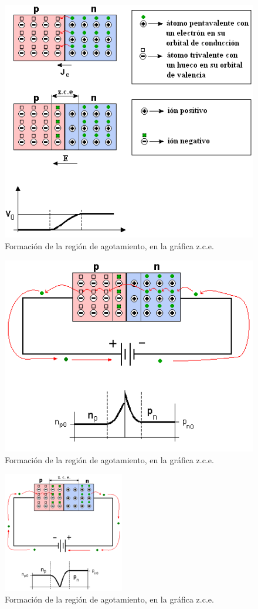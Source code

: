 \documentclass{article}
\author{Pablo Vivar Colina}
\begin{document}
\maketitle

\begin{figure}[h!]
\centering
\includegraphics[scale=0.5]{DiodoSem.png}
\caption{Formación de la región de agotamiento, en la gráfica z.c.e.}
\label{fig:diodoSem}
\end{figure}

\begin{figure}[h!]
\centering
\includegraphics[scale=0.4]{PolDir.png}
\caption{Formación de la región de agotamiento, en la gráfica z.c.e.}
\label{fig:diodoDir}
\end{figure}

\begin{figure}[h!]
\centering
\includegraphics[scale=0.7]{PolInv.png}
\caption{Formación de la región de agotamiento, en la gráfica z.c.e.}
\label{fig:diodoInv}
\end{figure}
\end{document}
